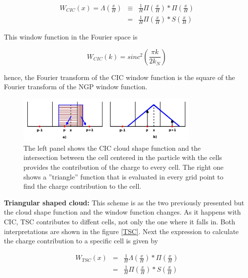 \begin{eqnarray*}
 W_{CIC}(x)  =  \Lambda \left( \frac{x}{H} \right) & \equiv & \frac{1}{H}\Pi\left(\frac{x}{H}\right) *\Pi \left(\frac{x}{H}\right) \\ 
&  = &\frac{1}{H}\Pi\left(\frac{x}{H}\right)*S\left(\frac{x}{H}\right)
\end{eqnarray*}

This window function in the Fourier space is

\[ W_{CIC}(k)= sinc^2\left(\frac{\pi k}{2k_N} \right)\]

hence, the Fourier transform of the CIC window function is the square of the Fourier 
transform of the NGP window function. 

\begin{figure}[htbp]
       \centering
               \includegraphics[width=0.8\textwidth]{Images/chapter3/CIC.png}
       \caption{\small The left panel shows the CIC cloud shape function and the intersection
       between the cell centered in the particle with the cells provides the contribution of
       the charge to every cell. The right one shows a ''triangle''	 function that is evaluated
       in every grid point to find the charge contribution to the cell. }
       \label{CIC}
 \end{figure}

\textbf{Triangular shaped cloud: } This scheme is as the two previously presented but the cloud
shape function and the window function changes. As it happens with CIC, TSC contributes to diffent
cells, not only the one where it falls in. Both interpretations are shown in the figure \ref{TSC}.
Next the expression to calculate the charge contribution to a specific cell is given by

\begin{eqnarray*}
 W_{TSC}(x)  &=& \frac{1}{H}\Lambda \left( \frac{x}{H} \right)*\Pi \left(\frac{x}{H}\right) \\ 
&  = &\frac{1}{H}\Pi\left(\frac{x}{H}\right)*S\left(\frac{x}{H}\right)
\end{eqnarray*}

